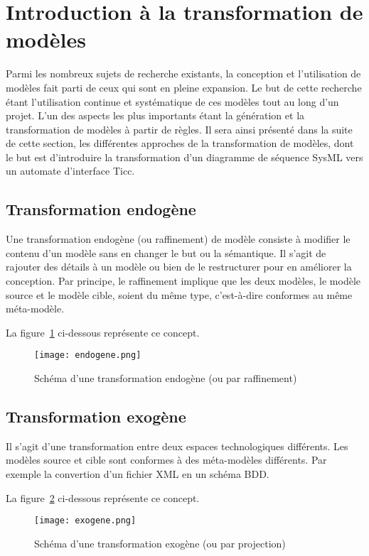 \section{Introduction {\`a} la transformation de mod{\`e}les}

Parmi les nombreux sujets de recherche existants, la conception et l'utilisation de mod{\`e}les fait parti de ceux qui sont en pleine expansion. Le but de cette recherche {\'e}tant l'utilisation continue et syst{\'e}matique de ces mod{\`e}les tout au long d'un projet. L'un des aspects les plus importants {\'e}tant la g{\'e}n{\'e}ration et la transformation de mod{\`e}les {\`a} partir de r{\`e}gles. Il sera ainsi pr{\'e}sent{\'e} dans la suite de cette section, les diff{\'e}rentes approches de la transformation de mod{\`e}les, dont le but est d'introduire la transformation d'un diagramme de s{\'e}quence SysML vers un automate d'interface Ticc.

\subsection{Transformation endog{\`e}ne}
Une transformation endog{\`e}ne (ou raffinement) de mod{\`e}le consiste {\`a} modifier le contenu d'un mod{\`e}le sans en changer le but ou la s{\'e}mantique. Il s'agit de rajouter des d{\'e}tails {\`a} un mod{\`e}le ou bien de le restructurer pour en am{\'e}liorer la conception. Par principe, le raffinement implique que les deux mod{\`e}les, le mod{\`e}le source et le mod{\`e}le cible, soient du m{\^e}me type, c'est-{\`a}-dire conformes au m{\^e}me m{\'e}ta-mod{\`e}le.

\noindent La figure~\ref{raffinement} ci-dessous repr{\'e}sente ce concept.
\begin{figure}[!ht]
	\centering
	\texttt{[image: endogene.png]}
	\caption{Sch{\'e}ma d'une transformation endog{\`e}ne (ou par raffinement)}
	\label{raffinement}

\end{figure}

\subsection{Transformation exog{\`e}ne}
Il s'agit d'une transformation entre deux espaces technologiques diff{\'e}rents. Les mod{\`e}les source et cible sont conformes {\`a} des m{\'e}ta-mod{\`e}les diff{\'e}rents. Par exemple la convertion d'un fichier XML en un sch{\'e}ma BDD.

\noindent La figure~\ref{projection} ci-dessous repr{\'e}sente ce concept.
\begin{figure}[!ht]
	\centering
	\texttt{[image: exogene.png]}
	\caption{Sch{\'e}ma d'une transformation exog{\`e}ne (ou par projection)}
	\label{projection}

\end{figure}

